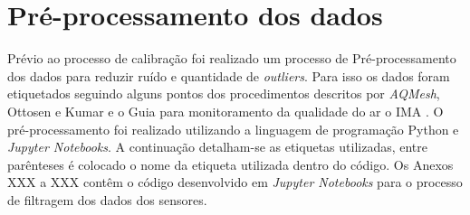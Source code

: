 \section{Pré-processamento dos dados}

Prévio ao processo de calibração foi realizado um processo de Pré-processamento dos dados para reduzir ruído e quantidade de \textit{outliers}. Para isso os dados foram etiquetados seguindo alguns pontos dos procedimentos descritos por \textit{AQMesh}, Ottosen e Kumar \cite{Ottosen2019OutlierMeasurements} e o Guia para monitoramento da qualidade do ar o IMA \cite{INSTITUTODEENERGIAEMEIOAMBIENTE2019QualidadeAr}. O pré-processamento foi realizado utilizando a linguagem de programação Python e \textit{Jupyter Notebooks}. A continuação detalham-se as etiquetas utilizadas, entre parênteses é colocado o nome da etiqueta utilizada dentro do código. Os Anexos XXX a XXX contêm o código desenvolvido em \textit{Jupyter Notebooks} para o processo de filtragem dos dados dos sensores.

